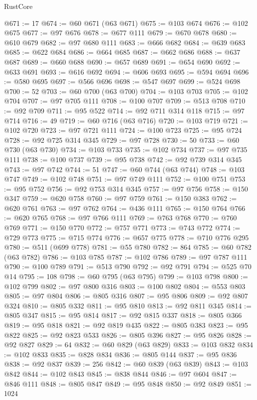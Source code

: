 \begin{lexlean}{RustCore}
\begin{coremodule}
@671 := 17
@674 := @60 @671 (@63 @671)
@675 := @103 @674
@676 := @102 @675
@677 := @97 @676
@678 := @677 @111
@679 := @670 @678
@680 := @610 @679
@682 := @97 @680 @111
@683 := @666 @682
@684 := @639 @683
@685 := @622 @684
@686 := @664 @685
@687 := @662 @686
@688 := @637 @687
@689 := @660 @688
@690 := @657 @689
@691 := @654 @690
@692 := @633 @691
@693 := @616 @692
@694 := @606 @693
@695 := @594 @694
@696 := @580 @695
@697 := @566 @696
@698 := @547 @697
@699 := @524 @698
@700 := 52
@703 := @60 @700 (@63 @700)
@704 := @103 @703
@705 := @102 @704
@707 := @97 @705 @111
@708 := @100 @707
@709 := @513 @708
@710 := @92 @709
@711 := @95 @522
@714 := @92 @711 @314 @118
@715 := @97 @714
@716 := 49
@719 := @60 @716 (@63 @716)
@720 := @103 @719
@721 := @102 @720
@723 := @97 @721 @111
@724 := @100 @723
@725 := @95 @724
@728 := @92 @725 @314 @345
@729 := @97 @728
@730 := 50
@733 := @60 @730 (@63 @730)
@734 := @103 @733
@735 := @102 @734
@737 := @97 @735 @111
@738 := @100 @737
@739 := @95 @738
@742 := @92 @739 @314 @345
@743 := @97 @742
@744 := 51
@747 := @60 @744 (@63 @744)
@748 := @103 @747
@749 := @102 @748
@751 := @97 @749 @111
@752 := @100 @751
@753 := @95 @752
@756 := @92 @753 @314 @345
@757 := @97 @756
@758 := @150 @347
@759 := @620 @758
@760 := @97 @759
@761 := @150 @383
@762 := @620 @761
@763 := @97 @762
@764 := @436 @111
@765 := @150 @764
@766 := @620 @765
@768 := @97 @766 @111
@769 := @763 @768
@770 := @760 @769
@771 := @150 @770
@772 := @757 @771
@773 := @743 @772
@774 := @729 @773
@775 := @715 @774
@776 := @657 @775
@778 := @710 @776 @295
@780 := @511 (@699 @778)
@781 := @55 @780
@782 := 864
@785 := @60 @782 (@63 @782)
@786 := @103 @785
@787 := @102 @786
@789 := @97 @787 @111
@790 := @100 @789
@791 := @513 @790
@792 := @92 @791
@794 := @525 @70 @14
@795 := 108
@798 := @60 @795 (@63 @795)
@799 := @103 @798
@800 := @102 @799
@802 := @97 @800 @316
@803 := @100 @802
@804 := @553 @803
@805 := @97 @804
@806 := @805 @316
@807 := @95 @806
@809 := @92 @807 @324
@810 := @805 @332
@811 := @95 @810
@813 := @92 @811 @345
@814 := @805 @347
@815 := @95 @814
@817 := @92 @815 @337
@818 := @805 @366
@819 := @95 @818
@821 := @92 @819 @435
@822 := @805 @383
@823 := @95 @822
@825 := @92 @823 @533
@826 := @805 @396
@827 := @95 @826
@828 := @92 @827
@829 := 64
@832 := @60 @829 (@63 @829)
@833 := @103 @832
@834 := @102 @833
@835 := @828 @834
@836 := @805 @144
@837 := @95 @836
@838 := @92 @837
@839 := 256
@842 := @60 @839 (@63 @839)
@843 := @103 @842
@844 := @102 @843
@845 := @838 @844
@846 := @97 @604
@847 := @846 @111
@848 := @805 @847
@849 := @95 @848
@850 := @92 @849
@851 := 1024

\end{coremodule}
\end{lexlean}
